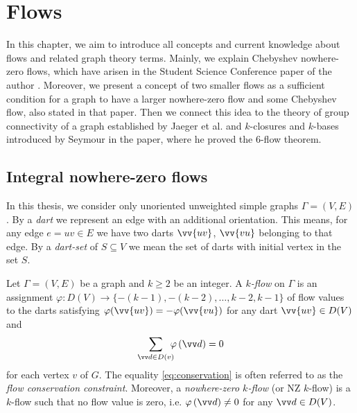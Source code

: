 \chapter{Flows} %

In this chapter, we aim to introduce all concepts and current knowledge about flows and related graph theory terms. Mainly, we explain Chebyshev nowhere-zero flows, which
have arisen in the Student Science Conference paper of the author \cite{svk}. Moreover, we present a concept of two smaller flows as a sufficient condition for a graph to have
a larger nowhere-zero flow and some Chebyshev flow, also stated in that paper. Then we connect this idea to the theory of group connectivity of a graph established by Jaeger
et al. \cite{group_connectivity} and $k$-closures and $k$-bases introduced by Seymour \cite{seymour} in the paper, where he proved the $6$-flow theorem.


\section{Integral nowhere-zero flows}

In this thesis, we consider only unoriented unweighted simple graphs $\Gamma=(V,E)$. By a \emph{dart} we represent an edge with an additional orientation. This means, for any edge $e=uv\in E$ we have two darts $\vv{uv}$, $\vv{vu}$ belonging to that edge. By a \emph{dart-set} of $S\subseteq V$ we mean the set of darts with initial vertex in the set $S$.

\begin{definition}
    Let $\Gamma=(V, E)$ be a graph and $k\geq 2$ be an integer. A \emph{$k$-flow} on $\Gamma$ is an assignment $\varphi\colon D(V)\to \{-(k-1), -(k-2),\dots, k-2, k-1\}$ of flow values to the darts satisfying
    $\varphi(\vv{uv})=-\varphi(\vv{vu})$ for any dart $\vv{uv}\in D(V)$ and
	\begin{equation}
		\sum_{\vv d\in D(v)} \mkern-10mu\varphi\left(\vv d\right) = 0 \label{eq:conservation}
	\end{equation}
    for each vertex $v$ of $G$. The equality \eqref{eq:conservation} is often referred to as the \textit{flow conservation constraint}. Moreover, a \emph{nowhere-zero $k$-flow} (or NZ $k$-flow) is a $k$-flow such that no flow value is zero, i.e. $\varphi\left(\vv d\right)\neq 0$ for any $\vv d\in D(V)$.
\end{definition}

